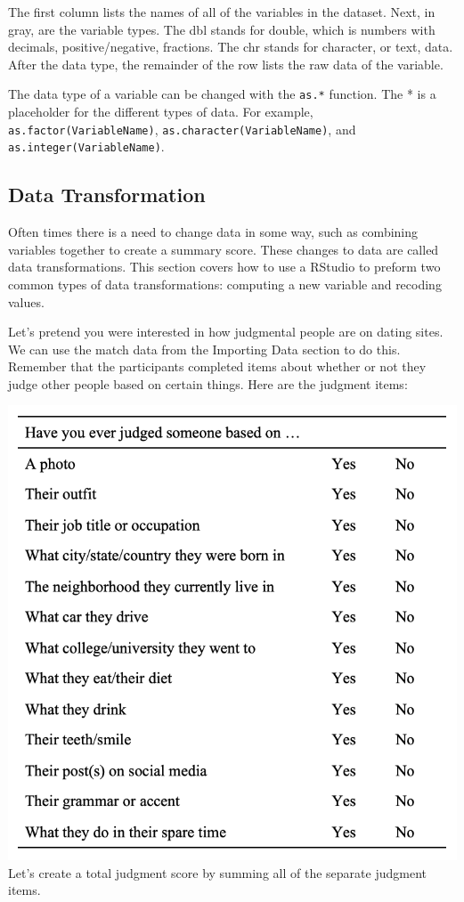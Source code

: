 \documentclass[
]{book}
\begin{document}
The first column lists the names of all of the variables in the dataset. Next, in gray, are the variable types. The dbl stands for double, which is numbers with decimals, positive/negative, fractions. The chr stands for character, or text, data. After the data type, the remainder of the row lists the raw data of the variable.

The data type of a variable can be changed with the \texttt{as.*} function. The * is a placeholder for the different types of data. For example, \texttt{as.factor(VariableName)}, \texttt{as.character(VariableName)}, and \texttt{as.integer(VariableName)}.

\hypertarget{data-transformation}{%
\subsection{Data Transformation}\label{data-transformation}}

Often times there is a need to change data in some way, such as combining variables together to create a summary score. These changes to data are called data transformations. This section covers how to use a RStudio to preform two common types of data transformations: computing a new variable and recoding values.

Let's pretend you were interested in how judgmental people are on dating sites. We can use the match data from the Importing Data section to do this. Remember that the participants completed items about whether or not they judge other people based on certain things. Here are the judgment items:

\includegraphics{img/match.png}
Let's create a total judgment score by summing all of the separate judgment items.
\end{document}
